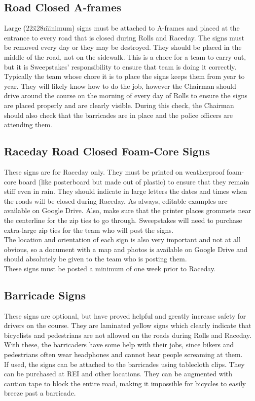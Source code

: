 \subsection{Road Closed A-frames}
Large (22\"x28\" minimum) signs must be attached to A-frames and placed
at the entrance to every road that is closed during Rolls and Raceday. The
signs must be removed every day or they may be destroyed. They should be
placed in the middle of the road, not on the sidewalk. This is a chore for a
team to carry out, but it is Sweepstakes' responsibility to ensure that team
is doing it correctly.
\\
Typically the team whose chore it is to place the signs keeps them from
year to year. They will likely know how to do the job, however the Chairman
should drive around the course on the morning of every day of Rolls to ensure
the signs are placed properly and are clearly visible. During this check,
the Chairman should also check that the barricades are in place and the police
officers are attending them.

\subsection{Raceday Road Closed Foam-Core Signs}
These signs are for Raceday only. They must be printed on weatherproof
foam-core board (like posterboard but made out of plastic) to
ensure that they remain stiff even in rain. They should indicate in large letters
the dates and times when the roads will be closed during Raceday. As always,
editable examples are available on Google Drive. Also, make sure that the
printer places grommets near the centerline for the zip ties to go through.
Sweepstakes will need to purchase extra-large zip ties for the team who
will post the signs.
\\
The location and orientation of each sign is also very
important and not at all obvious, so a document with a map and photos is
available on Google Drive and should absolutely be given to the team who is
posting them.
\\
These signs must be posted a minimum of one week prior to Raceday.

\subsection{Barricade Signs}
These signs are optional, but have proved helpful and greatly increase
safety for drivers on the course. They are laminated yellow
signs which clearly indicate that bicyclists and pedestrians are not allowed
on the roads during Rolls and Raceday. With these, the barricaders have some
help with their jobs, since bikers and pedestrians often wear headphones and
cannot hear people screaming at them.
\\
If used, the signs can be attached to the barricades using tablecloth clips.
They can be purchased at REI and other locations. They can be augmented with
caution tape to block the entire road, making it impossible for bicycles to
easily breeze past a barricade.

